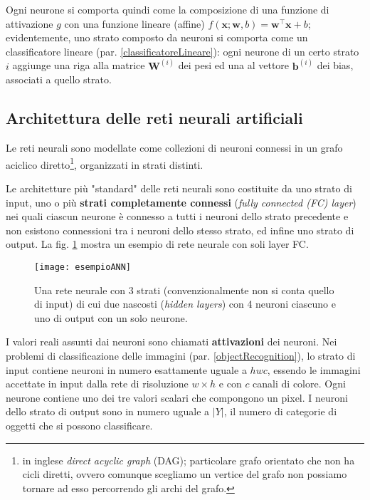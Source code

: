 Ogni neurone si comporta quindi come la composizione di una funzione di attivazione $g$ con una funzione lineare (affine) $f(\mathbf{x}; \mathbf{w}, b)=\mathbf{w}^\top\mathbf{x}+b$; evidentemente, uno strato composto da neuroni si comporta come un classificatore lineare (par. \ref{classificatoreLineare}): ogni neurone di un certo strato $i$ aggiunge una riga alla matrice $\mathbf{W}^{(i)}$ dei pesi ed una al vettore $\mathbf{b}^{(i)}$ dei bias, associati a quello strato.\\

\subsection{Architettura delle reti neurali artificiali}
\label{architetturaANN}
Le reti neurali sono modellate come collezioni di neuroni connessi in un grafo aciclico diretto\footnote{in inglese \textit{direct acyclic graph} (DAG); particolare grafo orientato che non ha cicli diretti, ovvero comunque scegliamo un vertice del grafo non possiamo tornare ad esso percorrendo gli archi del grafo.}, organizzati in strati distinti.

Le architetture più "standard" delle reti neurali sono costituite da uno strato di input, uno o più \textbf{strati completamente connessi} (\textit{fully connected (FC) layer}) nei quali ciascun neurone è connesso a tutti i neuroni dello strato precedente e non esistono connessioni tra i neuroni dello stesso strato, ed infine uno strato di output. La fig. \ref{fig:esempioANN} mostra un esempio di rete neurale con soli layer FC.

\begin{figure}[h]
\centering
\texttt{[image: esempioANN]}
\caption{Una rete neurale con 3 strati (convenzionalmente non si conta quello di input) di cui due nascosti (\textit{hidden layers}) con 4 neuroni ciascuno e uno di output con un solo neurone.}
\label{fig:esempioANN}
\end{figure}

I valori reali assunti dai neuroni sono chiamati \textbf{attivazioni} dei neuroni.
Nei problemi di classificazione delle immagini (par. \ref{objectRecognition}), lo strato di input contiene neuroni in numero esattamente uguale a $hwc$, essendo le immagini accettate in input dalla rete di risoluzione $w\times h$ e con $c$ canali di colore. Ogni neurone contiene uno dei tre valori scalari che compongono un pixel. I neuroni dello strato di output sono in numero uguale a $|Y|$, il numero di categorie di oggetti che si possono classificare.

